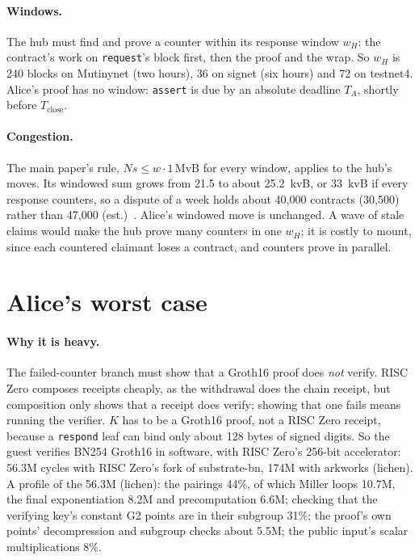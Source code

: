 \documentclass[11pt]{article}
\newcommand{\Tc}{T_{\mathrm{close}}}
\newcommand{\tx}[1]{\texttt{#1}}
\begin{document}
\paragraph{Windows.} The hub must find and prove a counter within its
response window $w_H$: the contract's work on \tx{request}'s block
first, then the proof and the wrap. So $w_H$ is 240 blocks on Mutinynet
(two hours), 36 on signet (six hours) and 72 on testnet4. Alice's
proof has no window: \tx{assert} is due by an absolute deadline $T_A$,
shortly before $\Tc$.

\paragraph{Congestion.} The main paper's rule, $N s \le w \cdot
1\,\mathrm{MvB}$ for every window, applies to the hub's moves. Its
windowed sum grows from 21.5 to about 25.2~kvB, or 33~kvB if every
response counters, so a dispute of a week holds about 40,000 contracts
(30,500) rather than 47,000 (est.)~\cite{lichenbabe}. Alice's windowed
move is unchanged. A wave of stale claims would make the hub prove many
counters in one $w_H$; it is costly to mount, since each countered
claimant loses a contract, and counters prove in parallel.

\section{Alice's worst case}
\label{sec:worst}

\paragraph{Why it is heavy.} The failed-counter branch must show that a
Groth16 proof does \emph{not} verify. RISC Zero composes receipts
cheaply, as the withdrawal does the chain receipt, but composition only
shows that a receipt does verify; showing that one fails means running
the verifier. $K$ has to be a Groth16 proof, not a RISC Zero receipt,
because a \tx{respond} leaf can bind only about 128 bytes of signed
digits. So the guest verifies BN254 Groth16 in software, with RISC
Zero's 256-bit accelerator: 56.3M cycles with RISC Zero's fork of
substrate-bn, 174M with arkworks (lichen). A profile of the 56.3M
(lichen): the pairings 44\%, of which Miller loops 10.7M, the final
exponentiation 8.2M and precomputation 6.6M; checking that the verifying
key's constant G2 points are in their subgroup 31\%; the proof's own
points' decompression and subgroup checks about 5.5M; the public input's
scalar multiplications 8\%.
\end{document}
